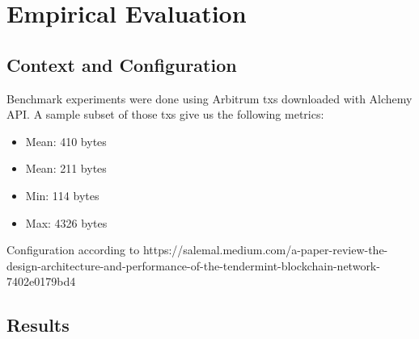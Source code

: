 \section{Empirical Evaluation}\label{sec:benchmark}
\subsection{Context and Configuration}
%
Benchmark experiments were done using Arbitrum txs downloaded with Alchemy API.
%
A sample subset of those txs give us the following metrics:
\begin{itemize}
	\item Mean: 410 bytes
	\item Mean: 211 bytes
	\item Min: 114 bytes
	\item Max: 4326 bytes
\end{itemize}
%

Configuration according to 
https://salemal.medium.com/a-paper-review-the-design-architecture-and-performance-of-the-tendermint-blockchain-network-7402e0179bd4


\subsection{Results}



